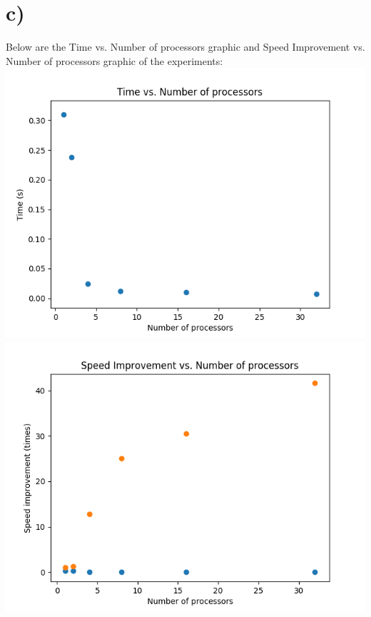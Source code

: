 \documentclass[12pt]{article}
\begin{document}
\section*{c)}
Below are the Time vs. Number of processors graphic and Speed Improvement vs. Number of processors graphic of the experiments:\\
\includegraphics[scale=1]{plot1}\\
\includegraphics[scale=1]{plot2} \\
\end{document}
